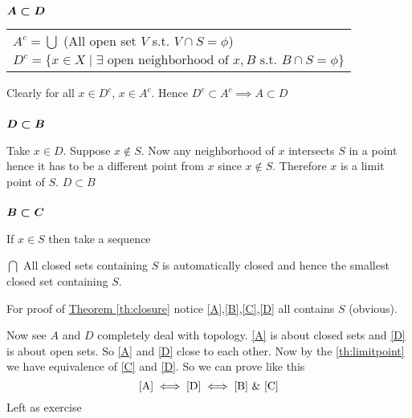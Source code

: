 \begin{myproof}
	\subsubsection*{$\boldsymbol{A\subset D}$}
	\begin{tabular}{l}\hspace{1.5cm}$A^c=\bigcup$ (All open set $V$ s.t. $V\cap S=\phi$) \\ \hspace{1.5cm}$D^c=\{x\in X\mid \exists \text{ open neighborhood of }x,B\text{ s.t. }B\cap S=\phi \}$\end{tabular}

	\setlength{\parindent}{0cm}Clearly for all $x\in D^c$, $x\in A^c$. Hence $D^c\subset A^c\implies A \subset D$\setlength{\parindent}{1cm}
	\subsubsection*{$\boldsymbol{D\subset B}$}
	Take $x\in D$. Suppose $x\notin S$. Now any neighborhood of $x$ intersects $S$ in a point hence it has to be a different point from $x$ since $x\notin S$. Therefore $x$ is a limit point of $S$. $D\subset B$
	\subsubsection*{$\boldsymbol{B\subset C}$}
	If $x\in S$ then take a sequence

\end{myproof}

\sol $\bigcap$ All closed sets containing $S$ is automatically closed and hence the smallest closed set containing $S$.
\begin{myproof}
	For proof of \hyperref[th:closure]{Theorem \ref{th:closure}} notice \ref{A},\ref{B},\ref{C},\ref{D} all contains $S$ (obvious).

	Now see $A$ and $D$ completely deal with topology. \ref{A} is about closed sets and \ref{D} is about open sets. So \ref{A} and \ref{D} close to each other. Now by the \ref{th:limitpoint} we have equivalence of \ref{C} and \ref{D}. So we can prove like this
	$$\ref{A}\iff\ref{D}\iff\ref{B}\ \&\ \ref{C}$$Left as exercise
\end{myproof}
